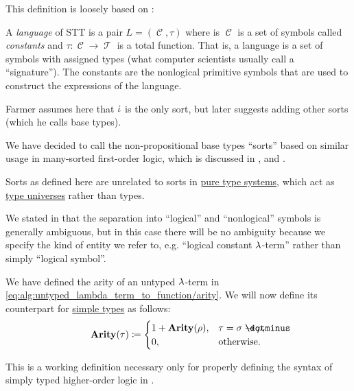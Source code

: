 \begin{comments}
  \item This definition is loosely based on :
  \begin{displayquote}
    A \textit{language} of STT is a pair \( L = (\mscrC, \tau) \) where is \( \mscrC \) is a set of symbols called \textit{constants} and \( \tau: \mscrC \to \mscrT \) is a total function. That is, a language is a set of symbols with assigned types (what computer scientists usually call a \enquote{signature}). The constants are the nonlogical primitive symbols that are used to construct the expressions of the language.
  \end{displayquote}

  Farmer assumes here that \( \dot{\iota} \) is the only sort, but later suggests adding other sorts (which he calls base types).

  We have decided to call the non-propositional base types \enquote{sorts} based on similar usage in many-sorted first-order logic, which is discussed in \cite[\S 4.4.13]{TroelstraSchwichtenberg2000BasicProofTheory}, \cite[\S 55.24]{Church1956LogicVol1} and \cite[def. 62]{GoguenBurstall1992Institutions}.

  \item Sorts as defined here are unrelated to sorts in \hyperref[def:pure_type_system]{pure type systems}, which act as \hyperref[con:type_universe]{type universes} rather than types.

  \item We stated in  that the separation into \enquote{logical} and \enquote{nonlogical} symbols is generally ambiguous, but in this case there will be no ambiguity because we specify the kind of entity we refer to, e.g. \enquote{logical constant \( {\mathrm \lambda} \)-term} rather than simply \enquote{logical symbol}.
\end{comments}

\begin{definition}\label{def:simple_type_arity}\mimprovised
  We have defined the arity of an untyped \( {\mathrm \lambda} \)-term in \eqref{eq:alg:untyped_lambda_term_to_function/arity}. We will now define its counterpart for \hyperref[def:simple_type]{simple types} as follows:
  \begin{equation*}
    \op*{Arity}(\tau) \coloneqq \begin{cases}
      1 + \op*{Arity}(\rho), &\tau = \sigma \synimplies \rho, \\
      0,                     &\T{otherwise.}
    \end{cases}
  \end{equation*}
\end{definition}
\begin{comments}
  \item This is a working definition necessary only for properly defining the syntax of simply typed higher-order logic in .
\end{comments}

